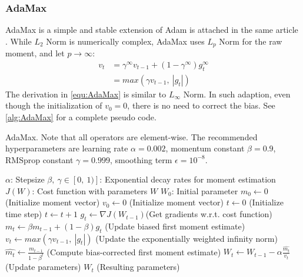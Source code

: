 \subsubsection{AdaMax}
AdaMax is a simple and stable extension of Adam is attached
in the same article \parencite{kingma2014adam}. While $L_2$ Norm
is numerically complex, AdaMax uses $L_p$ Norm for the 
 raw moment, and let $ p \rightarrow \infty $:
\begin{equation}
    \label{equ:AdaMax}
    \begin{split}
        v_t & = \gamma^\infty v_{t-1} + (1-\gamma^\infty)g_t^\infty \\
        & = max(\gamma v_{t-1},\ |g_t|)
    \end{split}
\end{equation}
The derivation in \autoref{equ:AdaMax} is similar to $L_\infty$ Norm.
In such adaption, even though the initialization of $ v_0 = 0 $, there
is no need to correct the bias. See \autoref{alg:AdaMax} for a complete 
pseudo code.
\begin{algorithm}
    \caption{AdaMax. Note that all operators are element-wise. The recommended
    hyperparameters are learning rate $ \alpha = 0.002 $, momentum 
    constant $ \beta = 0.9 $, RMSprop constant $ \gamma = 0.999 $, 
    smoothing term $ \epsilon = 10^{-8} $.}
    \label{alg:AdaMax}
    \begin{algorithmic}
    \REQUIRE $\alpha$: Stepsize
    \REQUIRE $\beta,\ \gamma \in [0,\ 1)]$: Exponential decay rates 
                for moment estimation
    \REQUIRE $J(W)$: Cost function with parameters $ W $
    \REQUIRE $W_0$: Initial parameter
    \STATE $m_0 \gets 0$ (Initialize  moment vector)
    \STATE $v_0 \gets 0$ (Initialize  moment vector)
    \STATE $t \gets 0$ (Initialize time step)
    \STATE $ t \gets t + 1 $ 
    \STATE $ g_t \gets \nabla J(W_{t-1}) $(Get gradients w.r.t. cost function)
    \STATE $ m_t \gets \beta m_{t-1} + (1-\beta)g_t $ (Update biased first moment estimate)
    \STATE $ v_t \gets max(\gamma v_{t-1},\ |g_t|) $ (Update the exponentially weighted infinity norm)
    \STATE $ \hat{m_t} \gets \frac{m_{t-1}}{1-\beta^t}$ (Compute bias-corrected first moment estimate)
    \STATE $ W_t \gets W_{t-1} - \alpha \frac{\hat{m_t}}{v_t} $ (Update parameters)
    \ENDWHILE
    \RETURN $ W_t $ (Resulting parameters)
    \end{algorithmic}
\end{algorithm}

